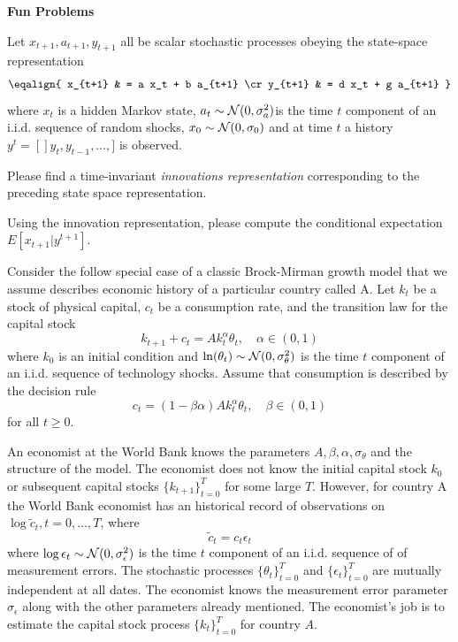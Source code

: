 

\paper

\overfullrule=0pt
\def\frac#1#2{#1\over #2}
%
\def\bmatrix#1{\left[ \matrix{#1} \right]}
\def\be{{\beta}}
\def\toone{{t+1}}

\overfullrule=0pt


\centerline{\bf  Fun Problems}


\medskip

 Let $x_{t+1}, a_{t+1}, y_{t+1}$ all be scalar stochastic processes obeying the 
state-space representation
$$\eqalign{ x_{t+1} & = a x_t + b a_{t+1} \cr
            y_{t+1} & = d x_t + g a_{t+1} }$$
where $x_t$ is a hidden Markov state, $a_t \sim {\cal N}(0, \sigma_a^2)$is the time $t$ component
of an i.i.d. sequence of random shocks, $x_0 \sim {\cal N}(0, \sigma_0)$
 and at time $t$ a history $y^t =[] y_t, y_{t-1}, \ldots, ]$ is observed.  

\medskip
{} Please find a time-invariant {\it innovations representation\/} corresponding to the preceding state
space representation.  

\medskip
{} Using the innovation representation,  please compute the conditional
expectation $E [x_{t+1} | y^{t+1}]$. 

\medskip


 Consider the follow special case of a classic Brock-Mirman growth model that 
we assume describes economic history of a particular country called A.
Let $k_t$ be a stock of physical capital, $c_t$ be a consumption rate, and the transition law for the capital 
stock 
$$ k_{t+1} + c_t = A k_t^\alpha \theta_t, \quad \alpha \in (0,1) $$
where $k_0$ is an initial condition and $\ln (\theta_t) \sim {\cal N}(0, \sigma_\theta^2)$ is the time $t$
component of an i.i.d. sequence of technology shocks.  Assume that consumption is described by
the decision rule
$$ c_t = (1-\beta \alpha) A k_t^\alpha \theta_t, \quad \beta \in (0,1) $$
for all $t \geq 0$.

An economist at the World Bank knows the parameters $A, \beta, \alpha, \sigma_\theta$ and the structure of
the model.  The economist does not know the initial capital stock $k_0$ or subsequent capital stocks
$\{k_{t+1}\}_{t=0}^T$ for some large $T$.  However, for country A the World Bank economist has an historical record
of observations on $\log \tilde c_t, t=0, \ldots, T$, where 
$$ \tilde c_t = c_t \epsilon_t $$
where $\log \epsilon_t \sim {\cal N}(0, \sigma_\epsilon^2)$ is the time $t$ component of an i.i.d. sequence of
of measurement errors.  The stochastic processes $\{\theta_t\}_{t=0}^T$ and $\{\epsilon_t\}_{t=0}^T$ are mutually
independent at all dates.  The economist knows the measurement error parameter $\sigma_\epsilon$ along with the 
other parameters already mentioned.  
The economist's job is to  estimate  the capital stock process $\{k_t\}_{t=0}^T$ for country $A$. 

